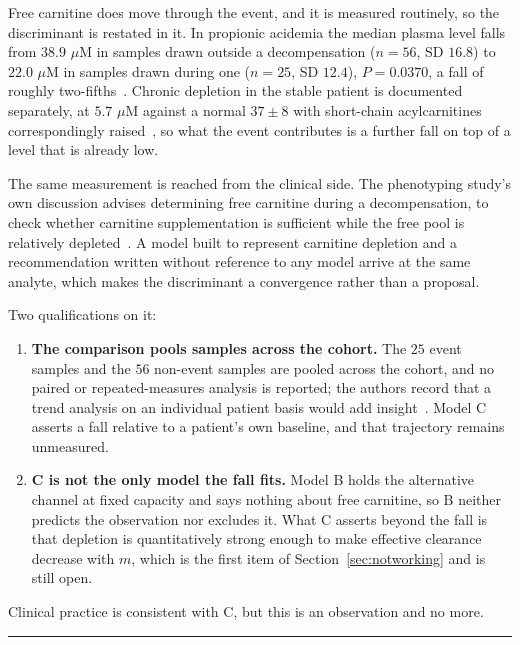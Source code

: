 Free carnitine does move through the event, and it is measured routinely, so the
discriminant is restated in it. In propionic acidemia the median plasma level falls from
$38.9$ $\mu$M in samples drawn outside a decompensation ($n = 56$, SD $16.8$) to $22.0$
$\mu$M in samples drawn during one ($n = 25$, SD $12.4$), $P = 0.0370$, a fall of
roughly two-fifths~\cite{amd_phenotyping}. %
Chronic depletion in the stable patient is documented separately, at $5.7$ $\mu$M against a
normal $37 \pm 8$ with short-chain acylcarnitines correspondingly
raised~\cite{carnitine_pa_child}, %
so what the event contributes is a further fall on top of a level that is already low.

The same measurement is reached from the clinical side. The phenotyping study's own
discussion advises determining free carnitine during a decompensation, to check whether
carnitine supplementation is sufficient while the free pool is relatively
depleted~\cite{amd_phenotyping}. %
A model built to represent carnitine depletion and a recommendation written without
reference to any model arrive at the same analyte, which makes the discriminant a
convergence rather than a proposal.

Two qualifications on it:

\begin{enumerate}[leftmargin=*, itemsep=2pt]
\item \textbf{The comparison pools samples across the cohort.} The
      $25$ event samples and the $56$ non-event samples are pooled across the cohort, and no
      paired or repeated-measures analysis is reported; the authors record that a trend
      analysis on an individual patient basis would add insight~\cite{amd_phenotyping}. %
      Model C asserts a fall relative to a patient's own baseline, and that trajectory
      remains unmeasured.
\item \textbf{C is not the only model the fall fits.} Model B holds the
      alternative channel at fixed capacity and says nothing about free carnitine, so B
      neither predicts the observation nor excludes it. What C asserts beyond the
      fall is that depletion is quantitatively strong enough to make effective clearance
      decrease with $m$, which is the first item of
      Section~\ref{sec:notworking} and is still open.
\end{enumerate}

Clinical practice is consistent with C, but this is an observation and no more.

\vspace{0.5em}
\hrule
\vspace{1em}

